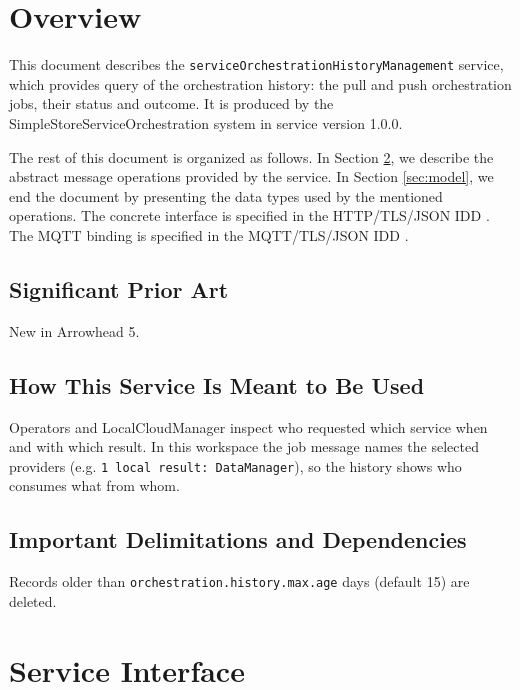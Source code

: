 \documentclass[a4paper]{arrowhead}
\begin{document}
\section{Overview}
\label{sec:overview}

This document describes the \texttt{service\allowbreak{}Orchestration\allowbreak{}History\allowbreak{}Management} service, which provides query of the orchestration history: the pull and push orchestration jobs, their status and outcome.
It is produced by the SimpleStoreServiceOrchestration system \cite{ssso-sysd} in service version 1.0.0.

The rest of this document is organized as follows.
In Section \ref{sec:operations}, we describe the abstract message operations provided by the service.
In Section \ref{sec:model}, we end the document by presenting the data types used by the mentioned operations.
The concrete interface is specified in the HTTP/TLS/JSON IDD \cite{ssso-serviceOrchestrationHistoryManagement-http-idd}. The MQTT binding is specified in the MQTT/TLS/JSON IDD \cite{ssso-serviceOrchestrationHistoryManagement-mqtt-idd}.

\subsection{Significant Prior Art}

New in Arrowhead 5.

\subsection{How This Service Is Meant to Be Used}

Operators and LocalCloudManager inspect who requested which service when and with which result. In this workspace the job message names the selected providers (e.g. \texttt{1 local result: Data\allowbreak{}Manager}), so the history shows who consumes what from whom.

\subsection{Important Delimitations and Dependencies}
\label{sec:delimitations}

Records older than \texttt{orchestration.\allowbreak{}history.\allowbreak{}max.\allowbreak{}age} days (default 15) are deleted.

\newpage

\section{Service Interface}
\label{sec:operations}
\end{document}
